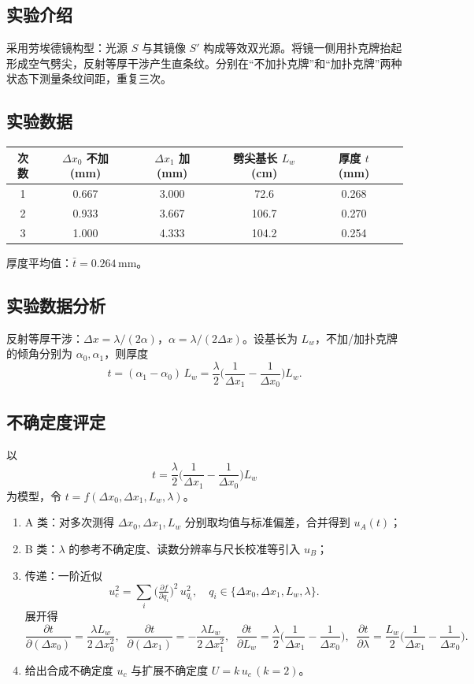 \documentclass[12pt,a4paper]{article}
\begin{document}
\subsection*{实验介绍}
采用劳埃德镜构型：光源 $S$ 与其镜像 $S'$ 构成等效双光源。将镜一侧用扑克牌抬起形成空气劈尖，反射等厚干涉产生直条纹。分别在“不加扑克牌”和“加扑克牌”两种状态下测量条纹间距，重复三次。

\subsection*{实验数据}
\begin{center}
\begin{tabular}{cccccc}
\toprule
次数 & $\Delta x_0$ 不加 (mm) & $\Delta x_1$ 加 (mm) & 劈尖基长 $L_w$ (cm) & 厚度 $t$ (mm) \\
\midrule
1 & 0.667 & 3.000 & 72.6 & 0.268  \\
2 & 0.933 & 3.667 & 106.7 & 0.270  \\
3 & 1.000 & 4.333 & 104.2 & 0.254  \\
\bottomrule
\end{tabular}
\end{center}

\noindent 厚度平均值：$\bar t = 0.264\,\mathrm{mm}$。

\subsection*{实验数据分析}
反射等厚干涉：$\Delta x = \lambda/(2\alpha)$，$\alpha = \lambda/(2\Delta x)$。设基长为 $L_w$，不加/加扑克牌的倾角分别为 $\alpha_0,\alpha_1$，则厚度
\[ t = (\alpha_1-\alpha_0)\,L_w = \frac{\lambda}{2}\Big(\frac{1}{\Delta x_1}-\frac{1}{\Delta x_0}\Big) L_w. \]

\subsection*{不确定度评定}
以
\[ t = \frac{\lambda}{2}\Big(\frac{1}{\Delta x_1}-\frac{1}{\Delta x_0}\Big) L_w \]
为模型，令 $t=f(\Delta x_0,\Delta x_1,L_w,\lambda)$。
\begin{enumerate}
	\item A 类：对多次测得 $\Delta x_0,\Delta x_1,L_w$ 分别取均值与标准偏差，合并得到 $u_A(t)$；
	\item B 类：$\lambda$ 的参考不确定度、读数分辨率与尺长校准等引入 $u_B$；
	\item 传递：一阶近似
	\[
		u_c^{2} = \sum_i \big( \tfrac{\partial f}{\partial q_i} \big)^{2} \, u_{q_i}^{2},\quad q_i\in\{\Delta x_0,\Delta x_1,L_w,\lambda\}.
	\]
	展开得
	\[
		\frac{\partial t}{\partial (\Delta x_0)}= \frac{\lambda L_w}{2\,\Delta x_0^{2}},\;\; \frac{\partial t}{\partial (\Delta x_1)}= -\frac{\lambda L_w}{2\,\Delta x_1^{2}},\;\; \frac{\partial t}{\partial L_w}= \frac{\lambda}{2}\Big(\frac{1}{\Delta x_1}-\frac{1}{\Delta x_0}\Big),\;\; \frac{\partial t}{\partial \lambda}= \frac{L_w}{2}\Big(\frac{1}{\Delta x_1}-\frac{1}{\Delta x_0}\Big).
	\]
	\item 给出合成不确定度 $u_c$ 与扩展不确定度 $U=k\,u_c\,(k=2)$。
\end{enumerate}
\end{document}
